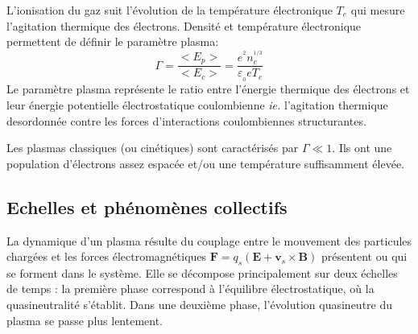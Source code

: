 			L'ionisation du gaz suit l'évolution de la température électronique $T_e$ qui
			mesure l'agitation thermique des électrons. Densité et température
			électronique permettent de définir le paramètre plasma:
			\begin{equation}
			\label{1-paramPlasma}
				\Gamma=\frac{<E_p>}{<E_c>}=\frac{e^{^2}n_e^{^{1/3}}}{\varepsilon_{_0}
				eT_e}
			\end{equation}
			Le paramètre plasma représente le ratio entre l'énergie thermique des
			électrons et leur énergie potentielle électrostatique coulombienne \emph{ie.}
			l'agitation thermique desordonnée contre les forces d'interactions
			coulombiennes structurantes. 
			
			Les plasmas classiques (ou cinétiques) sont caractérisés par
			$\Gamma\ll 1$. Ils ont une population d'électrons assez espacée et/ou une
			température suffisamment élevée.
			
		\subsection{Echelles et phénomènes collectifs}
		La dynamique d'un plasma résulte du couplage entre le mouvement des
		particules chargées et les forces électromagnétiques $\mathbf
		F=q_s(\mathbf E+ \mathbf v_s\times\mathbf B)$
		présentent ou qui se forment dans le système.
		Elle se décompose principalement sur deux échelles de temps : la première
		phase correspond à l'équilibre électrostatique, où la
		quasineutralité s'établit. Dans une deuxième phase, l'évolution quasineutre du
		plasma se passe plus lentement.

